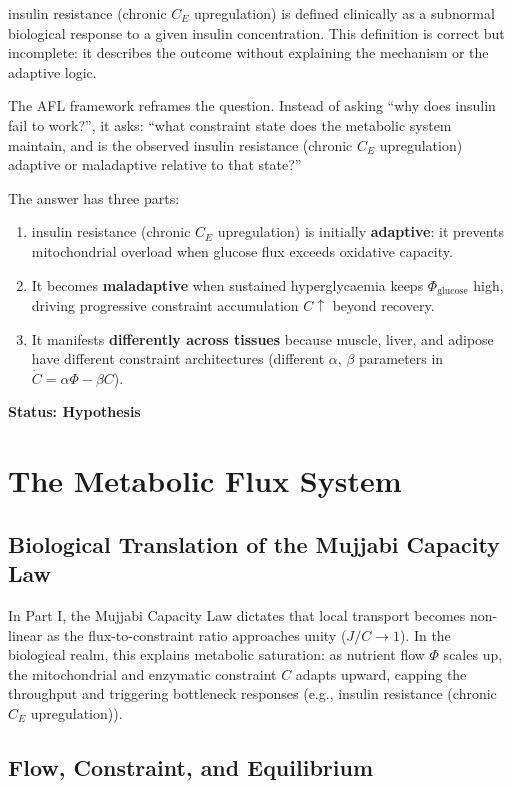 \documentclass[11pt]{article}
\begin{document}
insulin resistance (chronic $C_E$ upregulation) is defined clinically as a subnormal biological response to a given insulin concentration. This definition is correct but incomplete: it describes the outcome without explaining the mechanism or the adaptive logic.

The AFL framework reframes the question. Instead of asking ``why does insulin fail to work?'', it asks: ``what constraint state does the metabolic system maintain, and is the observed insulin resistance (chronic $C_E$ upregulation) adaptive or maladaptive relative to that state?''

The answer has three parts:
\begin{enumerate}
    \item insulin resistance (chronic $C_E$ upregulation) is initially \textbf{adaptive}: it prevents mitochondrial overload when glucose flux exceeds oxidative capacity.
    \item It becomes \textbf{maladaptive} when sustained hyperglycaemia keeps $\Phi_{\mathrm{glucose}}$ high, driving progressive constraint accumulation $C \uparrow$ beyond recovery.
    \item It manifests \textbf{differently across tissues} because muscle, liver, and adipose have different constraint architectures (different $\alpha$, $\beta$ parameters in $\dot{C} = \alpha\Phi - \beta C$).
\end{enumerate}

\textbf{Status: Hypothesis}

\section{The Metabolic Flux System}

\subsection{Biological Translation of the Mujjabi Capacity Law \cite{MujjabiPartI2026}}
In Part I, the Mujjabi Capacity Law \cite{MujjabiPartI2026} dictates that local transport becomes non-linear as the flux-to-constraint ratio approaches unity ($J/C \to 1$). In the biological realm, this explains metabolic saturation: as nutrient flow $\Phi$ scales up, the mitochondrial and enzymatic constraint $C$ adapts upward, capping the throughput and triggering bottleneck responses (e.g., insulin resistance (chronic $C_E$ upregulation)).


\subsection{Flow, Constraint, and Equilibrium}
\end{document}
